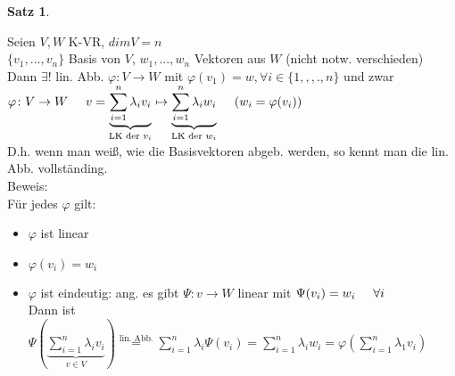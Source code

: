 \documentclass[a4paper,11pt]{article}
\newtheorem{satz}[definition]{Satz}
\newcommand{\hsp}{\hspace{5mm}}
\begin{document}
\newpage

\begin{satz}
\end{satz}
Seien $V,W$ K-VR, $dimV=n$ \\
$\{v_1,...,v_n\}$ Basis von $V$, $w_1,...,w_n$ Vektoren aus $W$ (nicht notw. verschieden) \\
Dann $\exists!$ lin. Abb. $\varphi\colon V\rightarrow W$ mit $\varphi(v_1)=w, \forall i\in\{1,,,.,n\}$ und zwar \\
$\varphi\colon V\rightarrow W\hsp v=\underbrace{\sum^n_{i=1}\lambda_iv_i}_{\text{LK der }v_i}\mapsto\underbrace{\sum^n_{i=1}\lambda_iw_i}_{\text{LK der }w_i}\hsp(w_i=\varphi(v_i))$ \\
D.h. wenn man weiß, wie die Basisvektoren abgeb. werden, so kennt man die lin. Abb. vollständing. \\
Beweis: \\
Für jedes $\varphi$ gilt: 
\vspace{-3mm}
\begin{itemize}
	\item $\varphi$ ist linear
	\item $\varphi(v_i)=w_i$
	\item $\varphi$ ist eindeutig: ang. es gibt $\Psi\colon v\rightarrow W$ linear mit $\Psi(v_i)=w_i\hsp\forall i$ \\
	Dann ist $\Psi(\underbrace{\sum^n_{i=1}\lambda_iv_i}_{v\in V})\overset{\text{lin. Abb.}}{=}\sum^n_{i=1}\lambda_i\Psi(v_i)=\sum^n_{i=1}\lambda_iw_i=\varphi(\sum^n_{i=1}\lambda_1v_i)$
\end{itemize}
\end{document}
